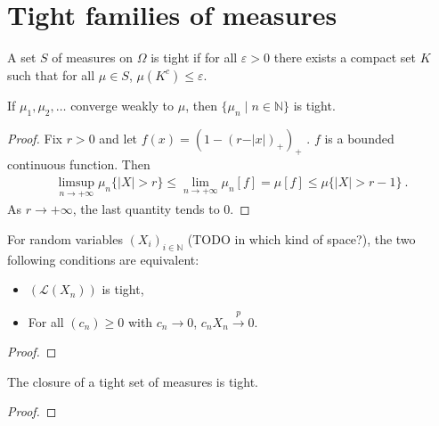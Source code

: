 \chapter{Tight families of measures}

\begin{definition}\label{def:tight}
 \mathlibok
A set $S$ of measures on $\Omega$ is tight if for all $\varepsilon > 0$ there exists a compact set $K$ such that for all $\mu \in S$, $\mu(K^c) \le \varepsilon$.
\end{definition}

\begin{lemma}\label{lem:tight_of_cvg}
If $\mu_1, \mu_2, \ldots$ converge weakly to $\mu$, then $\{\mu_n \mid n \in \mathbb{N}\}$ is tight.
\end{lemma}

\begin{proof}
Fix $r > 0$ and let $f(x) = (1 - (r - \vert x \vert)_+)_+$ . $f$ is a bounded continuous function. Then
\begin{align*}
\limsup_{n \to +\infty} \mu_n\{\vert X \vert > r\}
\le \lim_{n \to +\infty} \mu_n\left[ f \right]
= \mu[f]
\le \mu\{\vert X \vert > r - 1\} \: .
\end{align*}
As $r \to +\infty$, the last quantity tends to 0.
\end{proof}

\begin{lemma}\label{tight_iff_cvg_probability}
For random variables $(X_i)_{i \in \mathbb{N}}$ (TODO in which kind of space?), the two following conditions are equivalent:
\begin{itemize}
	\item $(\mathcal L(X_n))$ is tight,
	\item For all $(c_n) \ge 0$ with $c_n \to 0$, $c_n X_n \xrightarrow{p} 0$.
\end{itemize}
\end{lemma}

\begin{proof}

\end{proof}

\begin{lemma}\label{tight_closure}
The closure of a tight set of measures is tight.
\end{lemma}

\begin{proof}
\end{proof}

